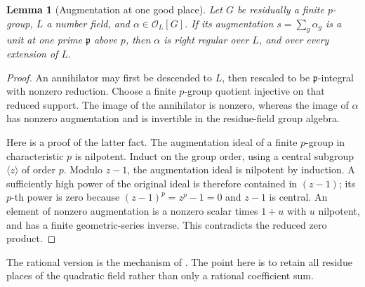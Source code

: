 \documentclass[11pt,a4paper,oneside]{report}
\newtheorem{lemma}[theorem]{Lemma}
\theoremstyle{definition}
\theoremstyle{remark}
\newcommand{\OO}{\mathcal O}
\begin{document}
\begin{lemma}[Augmentation at one good place]\label{M03:lem:augmentation}
Let \(G\) be residually a finite \(p\)-group, \(L\) a number field, and \(\alpha\in\OO_L[G]\). If its augmentation \(s=\sum_g\alpha_g\) is a unit at one prime \(\mathfrak p\) above \(p\), then \(\alpha\) is right regular over \(L\), and over every extension of \(L\).
\end{lemma}
\begin{proof}
An annihilator may first be descended to \(L\), then rescaled to be \(\mathfrak p\)-integral with nonzero reduction. Choose a finite \(p\)-group quotient injective on that reduced support. The image of the annihilator is nonzero, whereas the image of \(\alpha\) has nonzero augmentation and is invertible in the residue-field group algebra.

Here is a proof of the latter fact. The augmentation ideal of a finite \(p\)-group in characteristic \(p\) is nilpotent. Induct on the group order, using a central subgroup \(\langle z\rangle\) of order \(p\). Modulo \(z-1\), the augmentation ideal is nilpotent by induction. A sufficiently high power of the original ideal is therefore contained in \((z-1)\); its \(p\)-th power is zero because \((z-1)^p=z^p-1=0\) and \(z-1\) is central. An element of nonzero augmentation is a nonzero scalar times \(1+u\) with \(u\) nilpotent, and has a finite geometric-series inverse. This contradicts the reduced zero product.
\end{proof}
The rational version is the mechanism of \cite[Proposition 2.1 and Theorem 1.2]{B:ATrational}. The point here is to retain all residue places of the quadratic field rather than only a rational coefficient sum.
\end{document}
